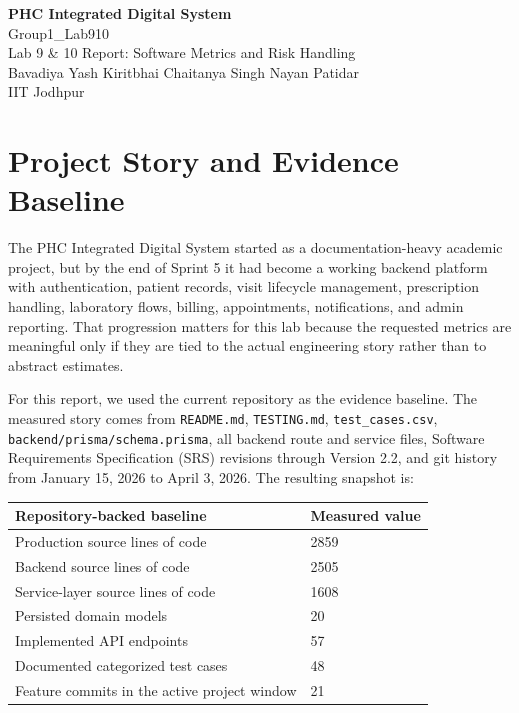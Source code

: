\documentclass[11pt,a4paper]{article}
\begin{document}
\begin{center}
{\LARGE\bfseries\color{TitleBlue} PHC Integrated Digital System}\\[0.3em]
{\Large Group1\_Lab910}\\[0.6em]
{\large Lab 9 \& 10 Report: Software Metrics and Risk Handling}\\[0.8em]
{\normalsize Bavadiya Yash Kiritbhai \quad Chaitanya Singh \quad Nayan Patidar}\\[0.3em]
{\normalsize IIT Jodhpur}\\[0.8em]
\end{center}

\section{Project Story and Evidence Baseline}
The PHC Integrated Digital System started as a documentation-heavy academic project, but by the end of Sprint 5 it had become a working backend platform with authentication, patient records, visit lifecycle management, prescription handling, laboratory flows, billing, appointments, notifications, and admin reporting. That progression matters for this lab because the requested metrics are meaningful only if they are tied to the actual engineering story rather than to abstract estimates.

For this report, we used the current repository as the evidence baseline. The measured story comes from \texttt{README.md}, \texttt{TESTING.md}, \texttt{test\_cases.csv}, \texttt{backend/prisma/schema.prisma}, all backend route and service files, Software Requirements Specification (SRS) revisions through Version 2.2, and git history from January 15, 2026 to April 3, 2026. The resulting snapshot is:

\begin{center}
\begin{tabular}{|p{8cm}|p{4cm}|}
\hline
\rowcolor{SoftBlue}
\textbf{Repository-backed baseline} & \textbf{Measured value} \\
\hline
Production source lines of code & 2859 \\
Backend source lines of code & 2505 \\
Service-layer source lines of code & 1608 \\
Persisted domain models & 20 \\
Implemented API endpoints & 57 \\
Documented categorized test cases & 48 \\
Feature commits in the active project window & 21 \\
\hline
\end{tabular}
\end{center}
\end{document}
